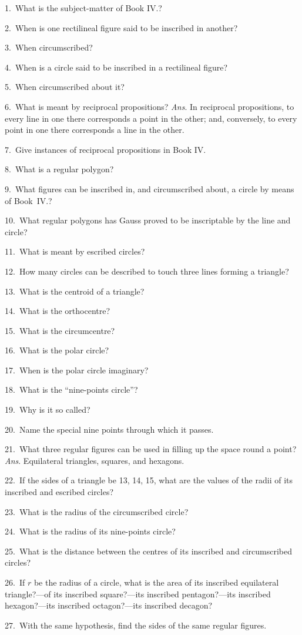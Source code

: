 \documentclass[oneside]{book}
\begin{document}
\begin{footnotesize}
1.~What is the subject-matter of Book IV\@.?

2.~When is one rectilineal figure said to be inscribed in
another?

3.~When circumscribed?

4.~When is a circle said to be inscribed in a rectilineal figure?

5.~When circumscribed about it?

6.~What is meant by reciprocal propositions? \textit{Ans}. In reciprocal
propositions, to every line in one there corresponds a point
in the other; and, conversely, to every point in one there corresponds
a line in the other.

7.~Give instances of reciprocal propositions in Book IV\@.

8.~What is a regular polygon?

9.~What figures can be inscribed in, and circumscribed about,
a circle by means of Book~IV\@.?

10.~What regular polygons has Gauss proved to be inscriptable
by the line and circle?

11.~What is meant by escribed circles?

12.~How many circles can be described to touch three lines
forming a triangle?

13.~What is the centroid of a triangle?

14.~What is the orthocentre?

15.~What is the circumcentre?

16.~What is the polar circle?

17.~When is the polar circle imaginary?

18.~What is the ``nine-points circle''?

19.~Why is it so called?

20.~Name the special nine points through which it passes.


21.~What three regular figures can be used in filling up the
space round a point? \textit{Ans}. Equilateral triangles, squares, and
hexagons.

22.~If the sides of a triangle be 13, 14, 15, what are the values
of the radii of its inscribed and escribed circles?

23.~What is the radius of the circumscribed circle?

24.~What is the radius of its nine-points circle?

25.~What is the distance between the centres of its inscribed
and circumscribed circles?

26.~If $r$ be the radius of a circle, what is the area of its
inscribed equilateral triangle?---of its inscribed square?---its
inscribed pentagon?---its inscribed hexagon?---its inscribed octagon?---its
inscribed decagon?

27.~With the same hypothesis, find the sides of the same regular
figures.
\par\end{footnotesize}
\end{document}
